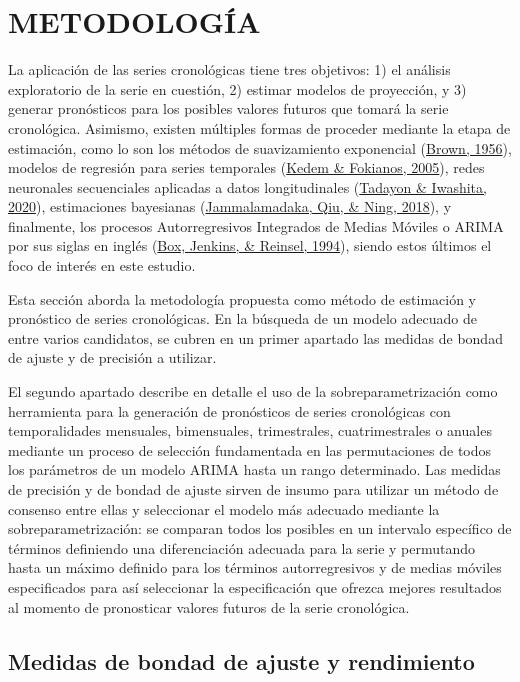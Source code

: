 \documentclass[
]{article}
\begin{document}
\newpage

\section{METODOLOGÍA}

La aplicación de las series cronológicas tiene tres objetivos: 1) el
análisis exploratorio de la serie en cuestión, 2) estimar modelos de
proyección, y 3) generar pronósticos para los posibles valores futuros
que tomará la serie cronológica. Asimismo, existen múltiples formas de
proceder mediante la etapa de estimación, como lo son los métodos de
suavizamiento exponencial (\protect\hyperlink{ref-brown}{Brown, 1956}),
modelos de regresión para series temporales
(\protect\hyperlink{ref-kedem}{Kedem \& Fokianos, 2005}), redes
neuronales secuenciales aplicadas a datos longitudinales
(\protect\hyperlink{ref-redes}{Tadayon \& Iwashita, 2020}), estimaciones
bayesianas (\protect\hyperlink{ref-bayes}{Jammalamadaka, Qiu, \& Ning,
2018}), y finalmente, los procesos Autorregresivos Integrados de Medias
Móviles o ARIMA por sus siglas en inglés
(\protect\hyperlink{ref-box-jenkins}{Box, Jenkins, \& Reinsel, 1994}),
siendo estos últimos el foco de interés en este estudio.

Esta sección aborda la metodología propuesta como método de estimación y
pronóstico de series cronológicas. En la búsqueda de un modelo adecuado
de entre varios candidatos, se cubren en un primer apartado las medidas
de bondad de ajuste y de precisión a utilizar.

El segundo apartado describe en detalle el uso de la
sobreparametrización como herramienta para la generación de pronósticos
de series cronológicas con temporalidades mensuales, bimensuales,
trimestrales, cuatrimestrales o anuales mediante un proceso de selección
fundamentada en las permutaciones de todos los parámetros de un modelo
ARIMA hasta un rango determinado. Las medidas de precisión y de bondad
de ajuste sirven de insumo para utilizar un método de consenso entre
ellas y seleccionar el modelo más adecuado mediante la
sobreparametrización: se comparan todos los posibles en un intervalo
específico de términos definiendo una diferenciación adecuada para la
serie y permutando hasta un máximo definido para los términos
autorregresivos y de medias móviles especificados para así seleccionar
la especificación que ofrezca mejores resultados al momento de
pronosticar valores futuros de la serie cronológica.

\subsection{Medidas de bondad de ajuste y rendimiento}
\end{document}
